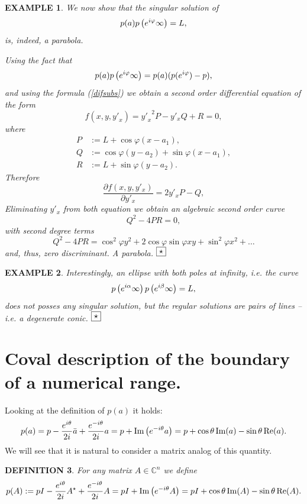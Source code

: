 \documentclass[10pt,a4paper,reqno]{amsart}
\newtheorem{defi}{\bf D\scriptsize EFINITION \normalsize}
\newtheorem{exa}[defi]{\bf E\scriptsize XAMPLE \normalsize}
\def\kopr{\hfill\raisebox{3pt}{\framebox{$\star$}}}
\newenvironment{example}{\begin{exa}\rm}{$\kopr$\end{exa}}
\newenvironment{definition}{\begin{defi}\rm}{\end{defi}}
\newcommand{\zav}[1]{\left( #1 \right)}
\newcommand{\imag}{{\rm i}}
\renewcommand\Re{\operatorname{Re}}
\renewcommand\Im{\operatorname{Im}}
\begin{document}
\begin{example}
We now show that the singular solution of
$$
p(a)p\zav{e^{\imag\varphi}\infty}=L,
$$
is, indeed, a parabola.
 
Using the fact that 
$$
p(a)p\zav{e^{\imag\varphi}\infty}=p(a)(p(e^{\imag\varphi})-p),
$$
and using the formula (\ref{difsubs}) we obtain a second order differential equation of the form
$$
f(x,y,{y'}_x)={{y'}_x}^2 P-y'_x Q +R=0,
$$
where
\begin{align*}
P&:=L+\cos\varphi(x-a_1),\\
Q&:=\cos\varphi(y-a_2)+\sin\varphi(x-a_1),\\
R&:=L+\sin\varphi(y-a_2).
\end{align*}
Therefore
$$
\frac{\partial f(x,y,y'_x)}{\partial y'_x}=2y'_x P- Q,
$$
Eliminating $y'_x$ from both equation we obtain an algebraic second order curve
$$
Q^2-4PR=0,
$$
with second degree terms
$$
Q^2-4PR=\cos^2\varphi y^2+2\cos\varphi\sin\varphi xy+\sin^2\varphi x^2+\dots
$$
and, thus, zero discriminant. A parabola.
\end{example}
\begin{example}
Interestingly, an ellipse with both poles at infinity, i.e. the curve
$$
p\zav{e^{\imag\alpha}\infty}p\zav{e^{\imag\beta}\infty}=L,
$$
does not posses any singular solution, but the regular solutions are pairs of lines -- i.e. a degenerate conic.
\end{example}






\section{Coval description of the boundary of a numerical range.}\label{Sec3}
Looking at the definition of $p(a)$ it holds:
\begin{equation}
p(a)=p-\frac{e^{\imag\theta}}{2\imag} \bar a+\frac{e^{-\imag \theta}}{2\imag} a= p+\Im \zav{e^{-\imag \theta}a}=p+\cos\theta\Im(a)-\sin\theta \Re(a).
\end{equation}
We will see that it is natural to consider a matrix analog of this quantity.
\begin{definition}
For any matrix $A\in\mathbb{C}^n$ we define
\begin{equation}\label{pAdef}
p(A):=p I-\frac{e^{\imag\theta}}{2\imag} A^\star+\frac{e^{-\imag \theta}}{2\imag} A= pI+\Im \zav{e^{-\imag \theta}A}=pI+\cos\theta\Im(A)-\sin\theta \Re(A).
\end{equation}
\end{definition}
\end{document}

